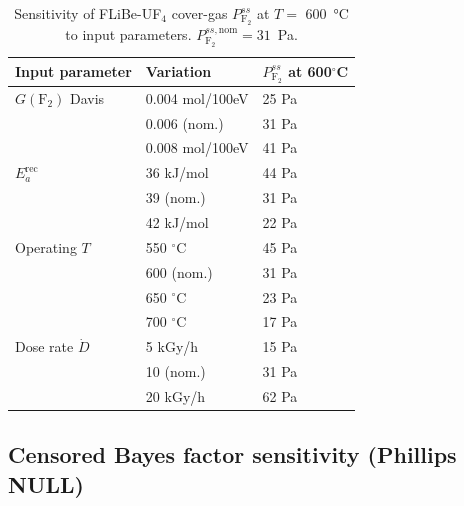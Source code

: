 \documentclass[11pt]{article}
\theoremstyle{plain}
\theoremstyle{definition}
\theoremstyle{remark}
\newcommand{\Ea}{E_a}
\begin{document}
\begin{table}[h!]
\centering
\caption{Sensitivity of FLiBe-UF$_4$ cover-gas $P_{\mathrm{F_2}}^{ss}$ at
$T = $ \SI{600}{\celsius} to input parameters.  $P_{\mathrm{F_2}}^{ss,\mathrm{nom}} = 31$~Pa.}
\label{tab:flibe-sens}
\small
\begin{tabular}{lll}
\toprule
Input parameter & Variation & $P_{\mathrm{F_2}}^{ss}$ at 600$^\circ$C \\
\midrule
$G(\mathrm{F}_2)$ Davis                & 0.004 mol/100eV & 25 Pa \\
                                       & 0.006 (nom.)    & 31 Pa \\
                                       & 0.008 mol/100eV & 41 Pa \\
$\Ea^{\mathrm{rec}}$                   & 36 kJ/mol       & 44 Pa \\
                                       & 39 (nom.)       & 31 Pa \\
                                       & 42 kJ/mol       & 22 Pa \\
Operating $T$                          & 550 $^\circ$C   & 45 Pa \\
                                       & 600 (nom.)      & 31 Pa \\
                                       & 650 $^\circ$C   & 23 Pa \\
                                       & 700 $^\circ$C   & 17 Pa \\
Dose rate $\dot{D}$                    & 5 kGy/h         & 15 Pa \\
                                       & 10 (nom.)       & 31 Pa \\
                                       & 20 kGy/h        & 62 Pa \\
\bottomrule
\end{tabular}
\end{table}

\subsection{Censored Bayes factor sensitivity (Phillips NULL)}
\end{document}
